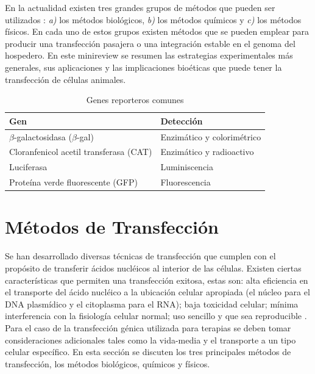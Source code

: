 \documentclass[fleqn,10pt]{SelfArx} %
\begin{document}
En la actualidad existen tres grandes grupos de métodos que pueden ser utilizados \cite{Kim:2010aa}: \textit{a)} los métodos biológicos, \textit{b)} los métodos químicos y \textit{c)} los métodos físicos. En cada uno de estos grupos existen métodos que se pueden emplear para producir una transfección pasajera o una integración estable en el genoma del hospedero. En este minireview se resumen las estrategias experimentales más generales, sus aplicaciones y las implicaciones bioéticas que puede tener la transfección de células animales.

\begin{table}[th!]
\centering
\begin{tabular}{p{8cm} p{4cm}} \toprule
Gen & Detección \\ \hline
$\beta$-galactosidasa ($\beta$-gal) & Enzimático y colorimétrico \\ 
Cloranfenicol acetil transferasa (CAT) & Enzimático y radioactivo \\
Luciferasa & Luminiscencia \\
Proteína verde fluorescente (GFP) & Fluorescencia \\ \bottomrule
\end{tabular}
\caption{Genes reporteros comunes}
\label{Tab:reportero}
\end{table}

\section{Métodos de Transfección}
Se han desarrollado diversas técnicas de transfección que cumplen con el propósito de transferir ácidos nucléicos al interior de las células. Existen ciertas características que permiten una transfección exitosa, estas son: alta eficiencia en el transporte del ácido nucléico a la ubicación celular apropiada (el núcleo para el DNA plasmídico y el citoplasma para el RNA); baja toxicidad celular; mínima interferencia con la fisiología celular normal; uso sencillo y que sea reproducible \cite{Schenborn}. Para el caso de la transfección génica utilizada para terapias se deben tomar consideraciones adicionales tales como la vida-media y el transporte a un tipo celular específico. En esta sección se discuten los tres principales métodos de transfección, los métodos biológicos, químicos y físicos.
\end{document}
